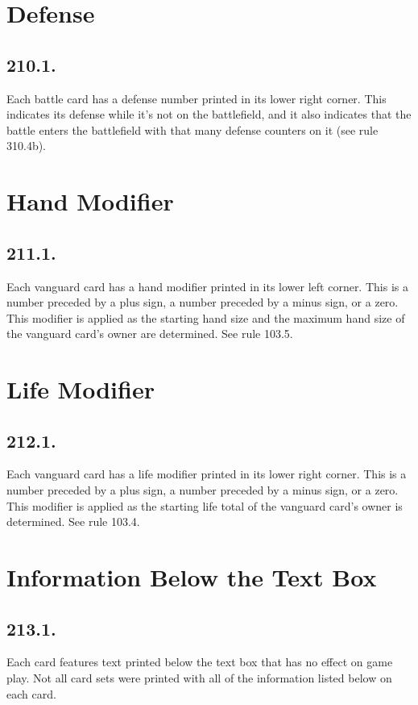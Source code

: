\section{Defense}
\subsection*{210.1.}
Each battle card has a defense number printed in its lower right corner. This indicates its defense while it’s not on the battlefield, and it also indicates that the battle enters the battlefield with that many defense counters on it (see rule 310.4b).

\section{Hand Modifier}
\subsection*{211.1.}
Each vanguard card has a hand modifier printed in its lower left corner. This is a number preceded by a plus sign, a number preceded by a minus sign, or a zero. This modifier is applied as the starting hand size and the maximum hand size of the vanguard card’s owner are determined. See rule 103.5.

\section{Life Modifier}
\subsection*{212.1.}
Each vanguard card has a life modifier printed in its lower right corner. This is a number preceded by a plus sign, a number preceded by a minus sign, or a zero. This modifier is applied as the starting life total of the vanguard card’s owner is determined. See rule 103.4.

\section{Information Below the Text Box}
\subsection*{213.1.}
Each card features text printed below the text box that has no effect on game play. Not all card sets were printed with all of the information listed below on each card.

